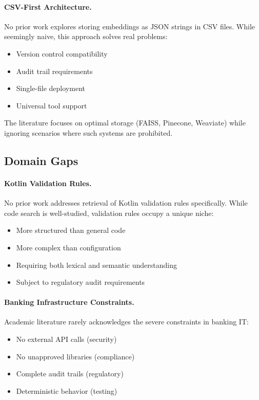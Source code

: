 \paragraph{CSV-First Architecture.} No prior work explores storing embeddings as JSON strings in CSV files. While seemingly naive, this approach solves real problems:
\begin{itemize}[leftmargin=*,itemsep=2pt,topsep=2pt]
 \item Version control compatibility
 \item Audit trail requirements
 \item Single-file deployment
 \item Universal tool support
\end{itemize}

The literature focuses on optimal storage (FAISS, Pinecone, Weaviate) while ignoring scenarios where such systems are prohibited.

\subsection{Domain Gaps}

\paragraph{Kotlin Validation Rules.} No prior work addresses retrieval of Kotlin validation rules specifically. While code search is well-studied, validation rules occupy a unique niche:
\begin{itemize}[leftmargin=*,itemsep=2pt,topsep=2pt]
 \item More structured than general code
 \item More complex than configuration
 \item Requiring both lexical and semantic understanding
 \item Subject to regulatory audit requirements
\end{itemize}

\paragraph{Banking Infrastructure Constraints.} Academic literature rarely acknowledges the severe constraints in banking IT:
\begin{itemize}[leftmargin=*,itemsep=2pt,topsep=2pt]
 \item No external API calls (security)
 \item No unapproved libraries (compliance)
 \item Complete audit trails (regulatory)
 \item Deterministic behavior (testing)
\end{itemize}

